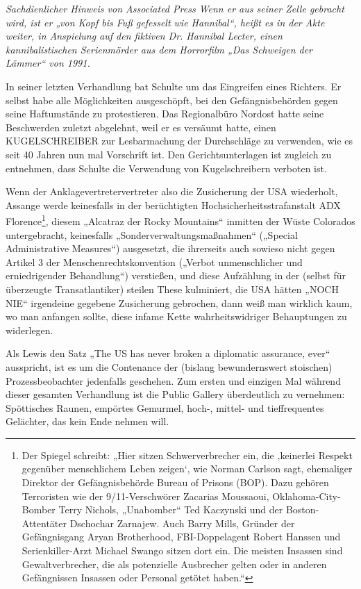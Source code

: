 \begin{multicols}{2}
\textit{Sachdienlicher Hinweis von Associated Press
Wenn er aus seiner Zelle gebracht wird, ist er „von Kopf bis
Fuß gefesselt wie Hannibal“, heißt es in der Akte weiter,
in Anspielung auf den fiktiven Dr. Hannibal Lecter, einen
kannibalistischen Serienmörder aus dem Horrorfilm
„Das Schweigen der Lämmer“ von 1991.}

In seiner letzten Verhandlung bat Schulte um das Eingreifen eines Richters. Er selbst habe alle Möglichkeiten
ausgeschöpft, bei den Gefängnisbehörden gegen seine
Haftumstände zu protestieren. Das Regionalbüro Nordost hatte seine Beschwerden zuletzt abgelehnt, weil er es
versäumt hatte, einen KUGELSCHREIBER zur Lesbarmachung der Durchschläge zu verwenden, wie es seit 40
Jahren nun mal Vorschrift ist. Den Gerichtsunterlagen ist
zugleich zu entnehmen, dass Schulte die Verwendung
von Kugelschreibern verboten ist.

Wenn der Anklagevertretervertreter also die Zusicherung der USA wiederholt, Assange werde keinesfalls
in der berüchtigten Hochsicherheitsstrafanstalt ADX
Florence\footnote[17]{Der Spiegel schreibt: „Hier sitzen Schwerverbrecher ein, die ‚keinerlei Respekt gegenüber menschlichem
Leben zeigen‘, wie Norman Carlson sagt, ehemaliger Direktor der Gefängnisbehörde Bureau of Prisons (BOP).
Dazu gehören Terroristen wie der 9/11-Verschwörer Zacarias Moussaoui, Oklahoma-City-Bomber Terry Nichols, „Unabomber“ Ted Kaczynski und der Boston-Attentäter Dschochar Zarnajew. Auch Barry Mills, Gründer
der Gefängnisgang Aryan Brotherhood, FBI-Doppelagent Robert Hanssen und Serienkiller-Arzt Michael Swango sitzen dort ein. Die meisten Insassen sind Gewaltverbrecher, die als potenzielle Ausbrecher gelten oder in
anderen Gefängnissen Insassen oder Personal getötet haben.“}, diesem „Alcatraz der Rocky Mountains“ inmitten der Wüste Colorados untergebracht, keinesfalls
„Sonderverwaltungsmaßnahmen“ („Special Administrative Measures“) ausgesetzt, die ihrerseits auch sowieso nicht gegen Artikel 3 der Menschenrechtskonvention
(„Verbot unmenschlicher und erniedrigender Behandlung“) verstießen, und diese Aufzählung in der (selbst
für überzeugte Transatlantiker) steilen These kulminiert,
die USA hätten „NOCH NIE“ irgendeine gegebene Zusicherung gebrochen, dann weiß man wirklich kaum, wo
man anfangen sollte, diese infame Kette wahrheitswidriger Behauptungen zu widerlegen.

Als Lewis den Satz „The US has never broken a diplomatic assurance, ever“ ausspricht, ist es um die Contenance der (bislang bewundernswert stoischen) Prozessbeobachter jedenfalls geschehen. Zum ersten und
einzigen Mal während dieser gesamten Verhandlung ist
die Public Gallery überdeutlich zu vernehmen: Spöttisches Raunen, empörtes Gemurmel, hoch-, mittel- und
tieffrequentes Gelächter, das kein Ende nehmen will.


\end{multicols}
